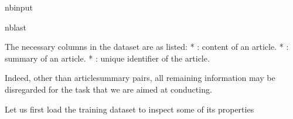 \documentclass[letterpaper,10pt,english]{sphinxmanual}
\begin{document}
\begin{sphinxuseclass}{nbinput}
\begin{sphinxuseclass}{nblast}
{
\begin{sphinxVerbatim}[commandchars=\\\{\}]
\llap{\color{nbsphinxin}[10]:\,\hspace{\fboxrule}\hspace{\fboxsep}}  
   
   
   
\end{sphinxVerbatim}
}

\end{sphinxuseclass}
\end{sphinxuseclass}
\sphinxAtStartPar
The necessary columns in the dataset are as listed: * : content of an article. * : summary of an article. * : unique identifier of the article.

\sphinxAtStartPar
Indeed, other than article\sphinxhyphen{}summary pairs, all remaining information may be disregarded for the task that we are aimed at conducting.

\sphinxAtStartPar
Let us first load the training dataset to inspect some of its properties
\end{document}
